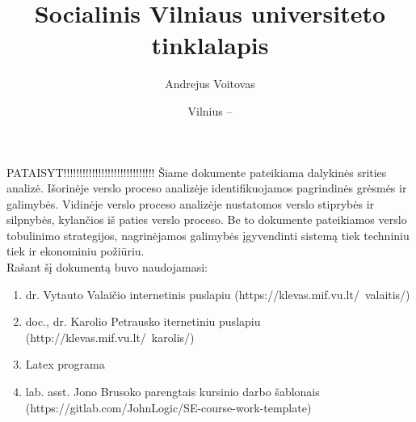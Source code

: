 \documentclass{VUMIFPSkursinis}
\title{Socialinis Vilniaus universiteto tinklalapis}
\author{Andrejus Voitovas}
\date{Vilnius – \the\year}
\begin{document}
\maketitle
\cleardoublepage{}
\setcounter{page}{2}
PATAISYT!!!!!!!!!!!!!!!!!!!!!!!!!!!!!
Šiame dokumente pateikiama dalykinės srities analizė. Išorinėje verslo proceso analizėje identifikuojamos pagrindinės grėsmės ir galimybės. Vidinėje verslo proceso analizėje nustatomos verslo stiprybės ir silpnybės, kylančios iš paties verslo proceso. Be to dokumente pateikiamos verslo tobulinimo strategijos, nagrinėjamos galimybės įgyvendinti sistemą tiek techniniu tiek ir ekonominiu požiūriu.\\
Rašant šį dokumentą buvo naudojamasi:
\begin{enumerate}
	\item dr. Vytauto Valaičio internetinis puslapiu (https://klevas.mif.vu.lt/~valaitis/) 
	\item doc., dr. Karolio Petrausko iternetiniu puslapiu (http://klevas.mif.vu.lt/~karolis/) 
	\item Latex programa
	\item lab. asst. Jono Brusoko parengtais kursinio darbo šablonais (https://gitlab.com/JohnLogic/SE-course-work-template)
	
\end{enumerate}
\newpage
\tableofcontents
\end{document}
